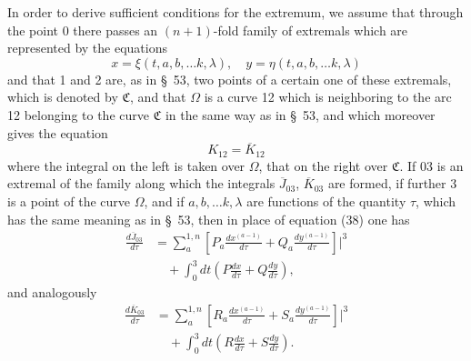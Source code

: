 \documentclass[11pt,a4paper,leqno]{article}
\begin{document}
In order to derive sufficient conditions for the extremum, we assume that through the point 0 there passes an $(n+1)$-fold family of extremals which are represented by the equations
\[
x=\xi(t,a,b,\ldots k,\lambda),\quad
y=\eta(t,a,b,\ldots k,\lambda)
\]
and that 1 and 2 are, as in \S~53, two points of a certain one of these extremals, which is denoted by $\mathfrak{C}$, and that $\Omega$ is a curve 12 which is neighboring to the arc 12 belonging to the curve $\mathfrak{C}$ in the same way as in \S~53, and which moreover gives the equation
\begin{equation}\tag{45}
K_{12}=\overline{K}_{12}
\end{equation}
where the integral on the left is taken over $\Omega$, that on the right over $\mathfrak{C}$. If 03 is an extremal of the family along which the integrals $\overline{J}_{03}$, $\overline{K}_{03}$ are formed, if further 3 is a point of the curve $\Omega$, and if $a,b,\ldots k,\lambda$ are functions of the quantity $\tau$, which has the same meaning as in \S~53, then in place of equation (38) one has
\begin{equation}\tag{46}
\begin{aligned}
\frac{d\overline{J}_{03}}{d\tau}
&=\sum_a^{1,n}\left[P_a\frac{dx^{(a-1)}}{d\tau}
+Q_a\frac{dy^{(a-1)}}{d\tau}\right]\bigg|^3\\
&\quad+\int_0^3dt\left(P\frac{dx}{d\tau}+Q\frac{dy}{d\tau}\right),
\end{aligned}
\end{equation}
and analogously
\begin{equation}\tag{47}
\begin{aligned}
\frac{d\overline{K}_{03}}{d\tau}
&=\sum_a^{1,n}\left[R_a\frac{dx^{(a-1)}}{d\tau}
+S_a\frac{dy^{(a-1)}}{d\tau}\right]\bigg|^3\\
&\quad+\int_0^3dt\left(R\frac{dx}{d\tau}+S\frac{dy}{d\tau}\right).
\end{aligned}
\end{equation}
\end{document}
